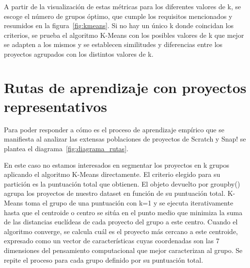 \documentclass[a4paper, 12pt]{book}
\begin{document}
A partir de la visualización de estas métricas para los diferentes valores de k, se escoge el número de grupos óptimo, que cumple los requisitos mencionados y resumidos en la figura~\ref{fig:kmeans}. Si no hay un único k donde coincidan los criterios, se prueba el algoritmo K-Means con los posibles valores de k que mejor se adapten a los mismos y se establecen similitudes y diferencias entre los proyectos agrupados con los distintos valores de k.

\section{Rutas de aprendizaje con proyectos representativos}  
\label{sec:rutas_diseño}

Para poder responder a cómo es el proceso de aprendizaje empírico que se manifiesta al analizar las extensas poblaciones de proyectos de Scratch y Snap! se plantea el diagrama~\ref{fig:diagrama_rutas}. 

En este caso no estamos interesados en segmentar los proyectos en k grupos aplicando el algoritmo K-Means directamente. El criterio elegido para su partición es la puntuación total que obtienen. El objeto devuelto por groupby() agrupa los proyectos de nuestro dataset en función de su puntuación total. K-Means toma el grupo de una puntuación con k=1 y se ejecuta iterativamente hasta que el centroide o centro se sitúa en el punto medio que minimiza la suma de las distancias euclídeas de cada proyecto del grupo a este centro. Cuando el algoritmo converge, se calcula cuál es el proyecto más cercano a este centroide, expresado como un vector de características cuyas coordenadas son las 7 dimensiones del pensamiento computacional que mejor caracterizan al grupo. Se repite el proceso para cada grupo definido por su puntuación total.
\end{document}
